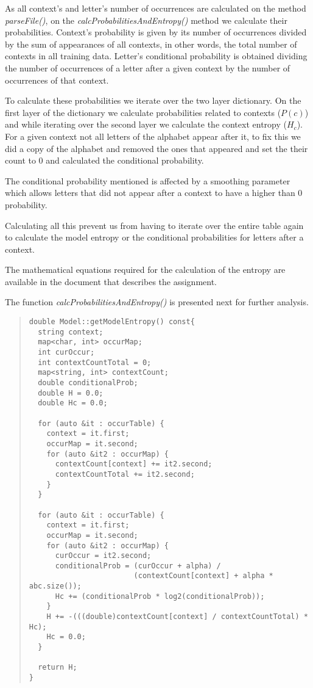 \documentclass[12pt]{article}
\begin{document}
As all context's and letter's number of occurrences are calculated on the
method {\it parseFile()}, on the {\it calcProbabilitiesAndEntropy()} method we
calculate their probabilities. Context's probability is given by its
number of occurrences divided by the sum of appearances of all contexts, in
other words, the total number of contexts in all training data. Letter's
conditional probability is obtained dividing the number of occurrences of a
letter after a given context by the number of occurrences of that context.

To calculate these probabilities we iterate over the two layer dictionary.
On the first layer of the dictionary we calculate probabilities related to
contexts (\(P(c)\)) and while iterating over the second layer we calculate
the context entropy (\(H_c\)). For a given context not all letters of the
alphabet appear after it, to fix this we did a copy of the alphabet
and removed the ones that appeared and set the their count to 0 and
calculated the conditional probability.

The conditional probability mentioned is affected by a smoothing parameter
which allows letters that did not appear after a context to have a
higher than 0 probability.

Calculating all this prevent us from having to iterate over the entire table
again to calculate the model entropy or the conditional probabilities for
letters after a context.

The mathematical equations required for the calculation of the entropy are available in the document that describes the assignment. 

The function {\it calcProbabilitiesAndEntropy()\/} is presented next for further
analysis.

\begingroup
\addtolength\leftmargini{-0.4in}
\addtolength\baselineskip{-0.05in}
\begin{quote}
\begin{verbatim}
double Model::getModelEntropy() const{
  string context;
  map<char, int> occurMap;
  int curOccur;
  int contextCountTotal = 0;
  map<string, int> contextCount;
  double conditionalProb;
  double H = 0.0;
  double Hc = 0.0;

  for (auto &it : occurTable) {
    context = it.first;
    occurMap = it.second;
    for (auto &it2 : occurMap) {
      contextCount[context] += it2.second;
      contextCountTotal += it2.second;
    }
  }

  for (auto &it : occurTable) {
    context = it.first;
    occurMap = it.second; 
    for (auto &it2 : occurMap) {
      curOccur = it2.second;
      conditionalProb = (curOccur + alpha) /
                        (contextCount[context] + alpha * abc.size());
      Hc += (conditionalProb * log2(conditionalProb));
    }
    H += -(((double)contextCount[context] / contextCountTotal) * Hc);
    Hc = 0.0;
  }

  return H; 
}
\end{verbatim}
\end{quote}
\endgroup
\newpage
\end{document}
